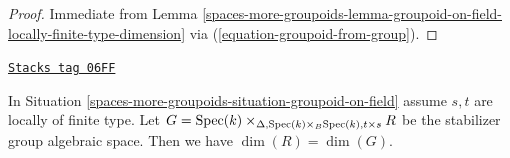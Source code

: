 \begin{proof}
Immediate from
Lemma \ref{spaces-more-groupoids-lemma-groupoid-on-field-locally-finite-type-dimension}
via (\ref{equation-groupoid-from-group}).
\end{proof}

\begin{lemma}
\label{spaces-more-groupoids-lemma-groupoid-on-field-dimension-equal-stabilizer}
\href{https://stacks.math.columbia.edu/tag/06FF}{\texttt{Stacks tag 06FF}}

In
Situation \ref{spaces-more-groupoids-situation-groupoid-on-field}
assume $s, t$ are locally of finite type.
Let
$G = \operatorname{Spec}(k)
\times_{\Delta, \operatorname{Spec}(k) \times_B \operatorname{Spec}(k), t \times s} R$
be the stabilizer group algebraic space.
Then we have $\dim(R) = \dim(G)$.
\end{lemma}

